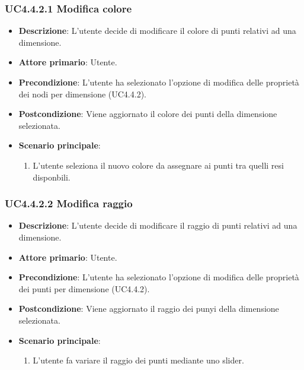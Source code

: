 \subsubsection{UC4.4.2.1 Modifica colore}
\label{subsec:uc4.4.2.1}
\begin{itemize}
    \item \textbf{Descrizione}: L'utente decide di modificare il colore di punti relativi ad una dimensione.

	
    \item \textbf{Attore primario}: Utente.
    
    \item \textbf{Precondizione}:   L'utente ha selezionato l'opzione di modifica delle proprietà dei nodi per dimensione (UC4.4.2).
    \item \textbf{Postcondizione}:  Viene aggiornato il colore dei punti della dimensione selezionata.

	\item \textbf{Scenario principale}:
        \begin{enumerate}
            \item L'utente seleziona il nuovo colore da assegnare ai punti tra quelli resi disponbili.
        \end{enumerate}
\end{itemize}

\subsubsection{UC4.4.2.2 Modifica raggio}
\label{subsec:uc4.4.2.2}
\begin{itemize}
    \item \textbf{Descrizione}: L'utente decide di modificare il raggio di punti relativi ad una dimensione.
	
    \item \textbf{Attore primario}: Utente.
    
    \item \textbf{Precondizione}:   L'utente ha selezionato l'opzione di modifica delle proprietà dei punti per dimensione (UC4.4.2).
    \item \textbf{Postcondizione}:  Viene aggiornato il raggio dei punyi della dimensione selezionata.

	\item \textbf{Scenario principale}:
        \begin{enumerate}
            \item L'utente fa variare il raggio dei punti mediante uno slider.
        \end{enumerate}
\end{itemize}

